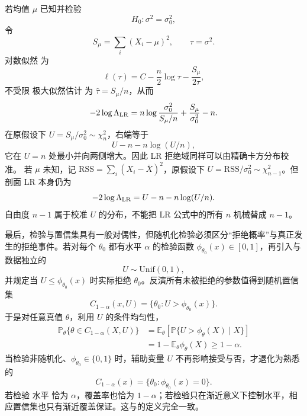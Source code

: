 \begin{proposition}[方差检验的卡方校准]
若均值 $\mu$ 已知并检验
\[
 H_0:\sigma^2=\sigma_0^2,
\]
令
\[
 S_\mu=\sum_i(X_i-\mu)^2,
 \qquad
 \tau=\sigma^2.
\]
对数似然 为
\[
 \ell(\tau)=C-\frac n2\log\tau-\frac{S_\mu}{2\tau},
\]
不受限 极大似然估计 为 $\widehat\tau=S_\mu/n$，从而
\begin{equation*}-2\log\Lambda_{\rm LR}
 =n\log\frac{\sigma_0^2}{S_\mu/n}
 +\frac{S_\mu}{\sigma_0^2}-n.
\end{equation*}
在原假设下 $U=S_\mu/\sigma_0^2\sim\chi^2_n$，右端等于
\[
 U-n-n\log(U/n),
\]
它在 $U=n$ 处最小并向两侧增大。因此 LR 拒绝域同样可以由精确卡方分布校准。
若 $\mu$ 未知，记 $\mathrm{RSS}=\sum_i(X_i-\bar X)^2$，原假设下
$U=\mathrm{RSS}/\sigma_0^2\sim\chi^2_{n-1}$。但剖面 LR 本身仍为
\[
 -2\log\Lambda_{\rm LR}=U-n-n\log(U/n).
\]
自由度 $n-1$ 属于校准 $U$ 的分布，不能把 LR 公式中的所有 $n$ 机械替成 $n-1$。

\end{proposition}

\begin{theorem}[随机化检验与置信集的反演]
最后，检验与置信集具有一般对偶性，但随机化检验必须区分“拒绝概率”与真正发生的拒绝事件。若对每个 $\theta_0$ 都有水平 $\alpha$ 的检验函数 $\phi_{\theta_0}(x)\in[0,1]$，再引入与数据独立的
\[
 U\sim\mathrm{Unif}(0,1),
\]
并规定当 $U\le\phi_{\theta_0}(x)$ 时实际拒绝 $\theta_0$。反演所有未被拒绝的参数值得到随机置信集
\begin{equation}\label{eq:math-stat-randomized-test-confidence-duality}
 C_{1-\alpha}(x,U)
 =\{\theta_0:U>\phi_{\theta_0}(x)\}.
\end{equation}
于是对任意真值 $\theta$，利用 $U$ 的条件均匀性，
\begin{align*}
 \mathbb P_\theta\{\theta\in C_{1-\alpha}(X,U)\}
 &=\mathbb E_\theta\!
 \left[
 \mathbb P\{U>\phi_\theta(X)\mid X\}
 \right]\\
 &=1-\mathbb E_\theta\phi_\theta(X)
 \ge1-\alpha.
\end{align*}
当检验非随机化、$\phi_{\theta_0}\in\{0,1\}$ 时，辅助变量 $U$ 不再影响接受与否，才退化为熟悉的
\[
 C_{1-\alpha}(x)=\{\theta_0:\phi_{\theta_0}(x)=0\}.
\]
若检验 水平 恰为 $\alpha$，覆盖率也恰为 $1-\alpha$；若检验只在渐近意义下控制水平，相应置信集也只有渐近覆盖保证。这与的定义完全一致。
\end{theorem}

